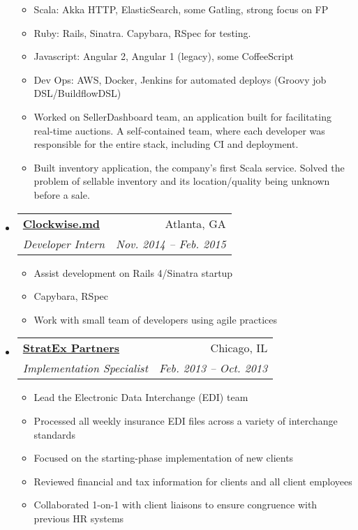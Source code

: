 \documentclass[letterpaper,11pt]{article}
\makeatletter
\newcommand{\resitem}[1]{\item #1 \vspace{-2pt}}
\newcommand{\ressubheading}[4]{
\begin{tabular*}{6.5in}{l@{\extracolsep{\fill}}r}
		\textbf{#1} & #2 \\
		\textit{#3} & \textit{#4} \\
\end{tabular*}\vspace{-6pt}}
\makeatother
\begin{document}
\begin{itemize}
{\begin{itemize}
        \resitem{Scala: Akka HTTP, ElasticSearch, some Gatling, strong focus on FP}
        \resitem{Ruby: Rails, Sinatra. Capybara, RSpec for testing.}
        \resitem{Javascript: Angular 2, Angular 1 (legacy), some CoffeeScript}
        \resitem{Dev Ops: AWS, Docker, Jenkins for automated deploys (Groovy job DSL/BuildflowDSL)}
        \resitem{Worked on SellerDashboard team, an application built for facilitating real-time auctions.
        A self-contained team, where each developer was responsible for the
        entire stack, including CI and deployment.}
        \resitem{Built inventory application, the company's first Scala
        service. Solved the problem of sellable inventory and its
        location/quality being unknown before a sale.}
    \end{itemize}
    }
\item
\ressubheading{\href{http://www.clockwise.md/}{Clockwise.md}}{Atlanta, GA}{Developer Intern}{Nov. 2014 -- Feb. 2015}
    { \footnotesize
    \begin{itemize}
        \resitem{Assist development on Rails 4/Sinatra startup}
        \resitem{Capybara, RSpec}
        \resitem{Work with small team of developers using agile practices}
    \end{itemize}
    }
\item
  \ressubheading{\href{http://www.stratexpartners.com/}{StratEx Partners}}{Chicago, IL}{Implementation Specialist}{Feb. 2013 -- Oct. 2013}
    { \footnotesize
    \begin{itemize}
        \resitem{Lead the Electronic Data Interchange (EDI) team}
        \resitem{Processed all weekly insurance EDI files across a variety of interchange standards}
        \resitem{Focused on the starting-phase implementation of new clients}
        \resitem{Reviewed financial and tax information for clients and all client employees}
        \resitem{Collaborated 1-on-1 with client liaisons to ensure congruence with previous HR systems}
    \end{itemize}
    }


\end{itemize}
\end{document}
